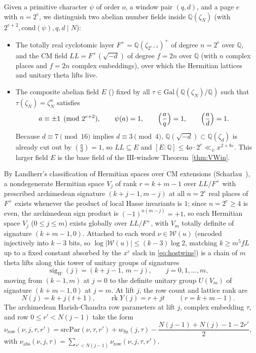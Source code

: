 \documentclass[11pt]{amsart}
\newcommand{\Q}{\mathbb{Q}}
\newcommand{\eps}{\varepsilon}
\newcommand{\Sha}{\mathrm{III}}
\DeclareMathOperator{\rk}{rk}
\theoremstyle{plain}
\theoremstyle{definition}
\numberwithin{equation}{section}
\begin{document}
Given a primitive character $\psi$ of order $o$, a window pair $(q,d)$, and a page $e$ with
$n=2^e$, we distinguish two abelian number fields inside $\Q(\zeta_N)$ (with
$2^{e+2},\mathrm{cond}(\psi),q,d\mid N$):
\begin{itemize}
\item The totally real cyclotomic layer $F^+=\Q(\zeta_{2^{e+2}})^+$ of degree $n=2^e$ over $\Q$,
  and the CM field $LL=F^+(\sqrt{-d})$ of degree $f=2n$ over $\Q$ (with $n$ complex places and
  $f=2n$ complex embeddings), over which the Hermitian lattices and unitary theta lifts live.
\item The composite abelian field $E$ () fixed by all
  $\tau\in\mathrm{Gal}(\Q(\zeta_N)/\Q)$ such that $\tau(\zeta_N)=\zeta_N^a$ satisfies
  \[
  a\equiv\pm1\pmod{2^{e+2}},\qquad \psi(a)=1,\qquad
  \Bigl(\frac{a}{q}\Bigr)=1,\qquad \Bigl(\frac{a}{d}\Bigr)=1.
  \]
  Because $d\equiv7\pmod{16}$ implies $d\equiv3\pmod4$, $\Q(\sqrt{-d})\subset\Q(\zeta_d)$ is
  already cut out by $(\frac{a}{d})=1$, so $LL\subseteq E$ and $[E:\Q]\le 4o\cdot 2^e\ll_\psi x^{2+8\eps}$.
  This larger field $E$ is the base field of the $\Sha$-window Theorem~\ref{thm:VWin}.
\end{itemize}

By Landherr's classification of Hermitian spaces over CM extensions
(Scharlau~\cite[Ch.~10, Thm.~6.9]{scharlau}), a nondegenerate Hermitian space $V_j$ of rank
$r=k+m-1$ over $LL/F^+$ with prescribed archimedean signature $(k+j-1,m-j)$ at all $n=2^e$ real
places of $F^+$ exists whenever the product of local Hasse invariants is $1$; since $n=2^e\ge 4$
is even, the archimedean sign product is $(-1)^{n(m-j)}=+1$, so each Hermitian space $V_j$
($0\le j\le m$) exists globally over $LL/F^+$, with $V_m$ totally definite of signature
$(k+m-1,0)$. Attached to each word $\nu\in\mathcal W(u)$ (encoded injectively into $k-3$ bits, so
$\log|\mathcal W(u)|\le(k-3)\log2$, matching $k\ge m^5 f L$ up to a fixed constant absorbed by the
$x^\eps$ slack in \eqref{eq:hostwins}) is a chain of $m$ theta lifts along this tower of unitary
groups of signatures
\begin{equation}\label{eq:sigchain}
\operatorname{sig}_W(j)=(k+j-1,\,m-j),\qquad j=0,1,\dots,m,
\end{equation}
moving from $(k-1,m)$ at $j=0$ to the definite unitary group $U(V_m)$ of signature $(k+m-1,0)$ at
$j=m$. At lift $j$,
the row count and lattice rank are
\begin{equation}\label{eq:rowranks}
N(j)=k+j(t+1),\qquad \rk Y(j)=r+jt\qquad (r=k+m-1).
\end{equation}
The archimedean Harish-Chandra row parameters at lift $j$, complex embedding $\tau$, and row
$0\le r'<N(j-1)$ take the form
\begin{equation}\label{eq:nurow}
\nu_{\mathrm{row}}(\nu,j,\tau,r')=\mathrm{srcPar}(\nu,\tau,r')+w_{\mathrm{Sz}}(j,\tau)
-\frac{N(j-1)+N(j)-1-2r'}{2},
\end{equation}
with $\nu_{\mathrm{abs}}(\nu,j,\tau)=\sum_{r'<N(j-1)}\nu_{\mathrm{row}}(\nu,j,\tau,r')$.
\end{document}
